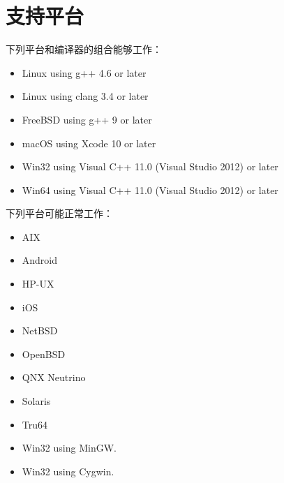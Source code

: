 \section{支持平台}
下列平台和编译器的组合能够工作：
\begin{itemize}
	\item Linux using g++ 4.6 or later
	\item Linux using clang 3.4 or later
	\item FreeBSD using g++ 9 or later
	\item macOS using Xcode 10 or later
	\item Win32 using Visual C++ 11.0 (Visual Studio 2012) or later
	\item Win64 using Visual C++ 11.0 (Visual Studio 2012) or later
\end{itemize}
下列平台可能正常工作：
\begin{itemize}
	\item AIX
	\item Android
	\item HP-UX
	\item iOS
	\item NetBSD
	\item OpenBSD
	\item QNX Neutrino
	\item Solaris
	\item Tru64
	\item Win32 using MinGW.
	\item Win32 using Cygwin.
\end{itemize}
